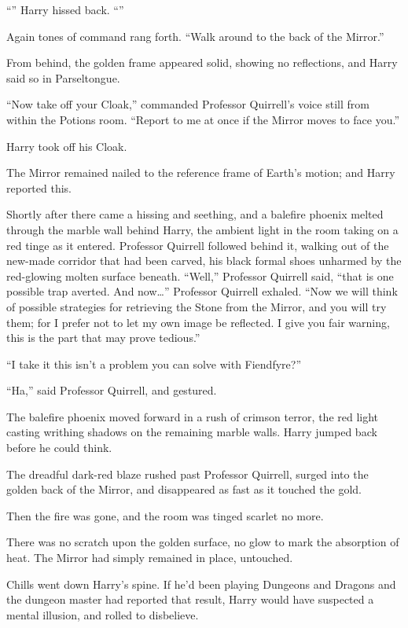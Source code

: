 “” Harry hissed back. “”

Again tones of command rang forth. “Walk around to the back of the Mirror.”

From behind, the golden frame appeared solid, showing no reflections, and Harry
said so in Parseltongue.

“Now take off your Cloak,” commanded Professor Quirrell’s voice still from
within the Potions room. “Report to me at once if the Mirror moves to face you.”

Harry took off his Cloak.

The Mirror remained nailed to the reference frame of Earth’s motion; and Harry
reported this.

Shortly after there came a hissing and seething, and a balefire phoenix melted
through the marble wall behind Harry, the ambient light in the room taking on a
red tinge as it entered. Professor Quirrell followed behind it, walking out of
the new-made corridor that had been carved, his black formal shoes unharmed by
the red-glowing molten surface beneath. “Well,” Professor Quirrell said, “that
is one possible trap averted. And now…” Professor Quirrell exhaled. “Now
we will think of possible strategies for retrieving the Stone from the Mirror,
and you will try them; for I prefer not to let my own image be reflected. I
give you fair warning, this is the part that may prove tedious.”

“I take it this isn’t a problem you can solve with Fiendfyre?”

“Ha,” said Professor Quirrell, and gestured.

The balefire phoenix moved forward in a rush of crimson terror, the red light
casting writhing shadows on the remaining marble walls. Harry jumped back
before he could think.

The dreadful dark-red blaze rushed past Professor Quirrell, surged into the
golden back of the Mirror, and disappeared as fast as it touched the gold.

Then the fire was gone, and the room was tinged scarlet no more.

There was no scratch upon the golden surface, no glow to mark the absorption of
heat. The Mirror had simply remained in place, untouched.

Chills went down Harry’s spine. If he’d been playing Dungeons and Dragons and
the dungeon master had reported that result, Harry would have suspected a
mental illusion, and rolled to disbelieve.

